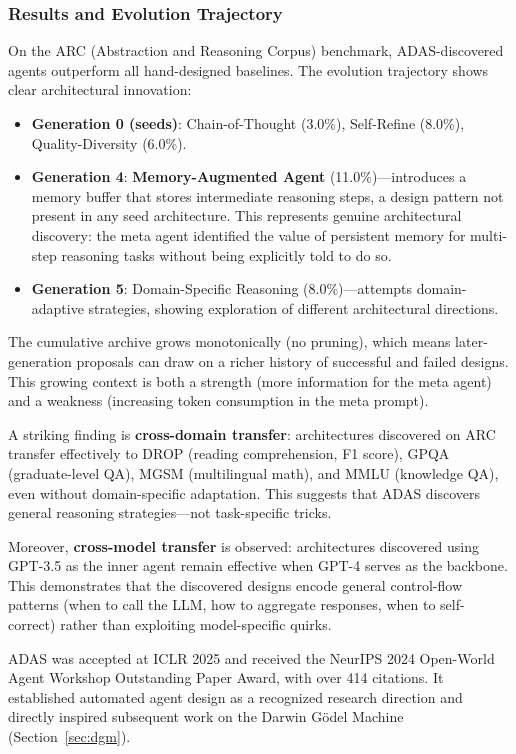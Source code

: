 \subsubsection{Results and Evolution Trajectory}

On the ARC (Abstraction and Reasoning Corpus) benchmark, ADAS-discovered agents outperform all hand-designed baselines. The evolution trajectory shows clear architectural innovation:

\begin{itemize}
\item \textbf{Generation 0 (seeds)}: Chain-of-Thought (3.0\%), Self-Refine (8.0\%), Quality-Diversity (6.0\%).
\item \textbf{Generation 4}: \textbf{Memory-Augmented Agent} (11.0\%)---introduces a memory buffer that stores intermediate reasoning steps, a design pattern not present in any seed architecture. This represents genuine architectural discovery: the meta agent identified the value of persistent memory for multi-step reasoning tasks without being explicitly told to do so.
\item \textbf{Generation 5}: Domain-Specific Reasoning (8.0\%)---attempts domain-adaptive strategies, showing exploration of different architectural directions.
\end{itemize}

The cumulative archive grows monotonically (no pruning), which means later-generation proposals can draw on a richer history of successful and failed designs. This growing context is both a strength (more information for the meta agent) and a weakness (increasing token consumption in the meta prompt).

A striking finding is \textbf{cross-domain transfer}: architectures discovered on ARC transfer effectively to DROP (reading comprehension, F1 score), GPQA (graduate-level QA), MGSM (multilingual math), and MMLU (knowledge QA), even without domain-specific adaptation. This suggests that ADAS discovers general reasoning strategies---not task-specific tricks.

Moreover, \textbf{cross-model transfer} is observed: architectures discovered using GPT-3.5 as the inner agent remain effective when GPT-4 serves as the backbone. This demonstrates that the discovered designs encode general control-flow patterns (when to call the LLM, how to aggregate responses, when to self-correct) rather than exploiting model-specific quirks.

ADAS was accepted at ICLR 2025 and received the NeurIPS 2024 Open-World Agent Workshop Outstanding Paper Award, with over 414 citations. It established automated agent design as a recognized research direction and directly inspired subsequent work on the Darwin G\"odel Machine (Section~\ref{sec:dgm}).

